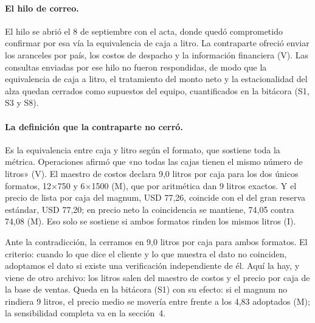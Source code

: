 \paragraph{El hilo de correo.} El hilo se abrió el 8 de septiembre con el acta, donde quedó comprometido confirmar por esa vía la equivalencia de caja a litro. La contraparte ofreció enviar los aranceles por país, los costos de despacho y la información financiera (V). Las consultas enviadas por ese hilo no fueron respondidas, de modo que la equivalencia de caja a litro, el tratamiento del monto neto y la estacionalidad del alza quedan cerrados como supuestos del equipo, cuantificados en la bitácora (S1, S3 y S8).

\paragraph{La definición que la contraparte no cerró.} Es la equivalencia entre caja y litro según el formato, que sostiene toda la métrica. Operaciones afirmó que «no todas las cajas tienen el mismo número de litros» (V). El maestro de costos declara 9,0 litros por caja para los dos únicos formatos, 12$\times$750 y 6$\times$1500 (M), que por aritmética dan 9 litros exactos. Y el precio de lista por caja del magnum, USD 77,26, coincide con el del gran reserva estándar, USD 77,20; en precio neto la coincidencia se mantiene, 74,05 contra 74,08 (M). Eso solo se sostiene si ambos formatos rinden los mismos litros (I).

Ante la contradicción, la cerramos en 9,0 litros por caja para ambos formatos. El criterio: cuando lo que dice el cliente y lo que muestra el dato no coinciden, adoptamos el dato si existe una verificación independiente de él. Aquí la hay, y viene de otro archivo: los litros salen del maestro de costos y el precio por caja de la base de ventas. Queda en la bitácora (S1) con su efecto: si el magnum no rindiera 9 litros, el precio medio se movería entre  frente a los 4,83 adoptados (M); la sensibilidad completa va en la sección~4.
